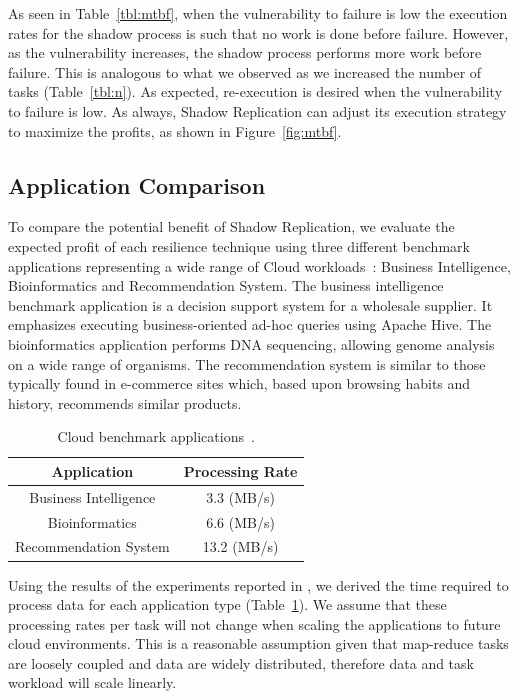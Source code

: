 As seen in Table~\ref{tbl:mtbf}, when the vulnerability to
failure is low the execution rates for the shadow process is such
that no work is done before failure. However, as the
vulnerability increases, the shadow process performs more work before
failure. This is analogous to what we observed as we increased the
number of tasks (Table~\ref{tbl:n}). As expected,
re-execution is desired when the vulnerability to failure is
low. As always, Shadow Replication can adjust its execution strategy to maximize the profits, as shown in Figure~\ref{fig:mtbf}.

\subsection{Application Comparison}

To compare the potential benefit of Shadow Replication, we evaluate
the expected profit of each resilience technique using three different
benchmark applications representing a wide range of
Cloud workloads~\cite{mrbs}: Business Intelligence, Bioinformatics and
Recommendation System. The business intelligence benchmark application
is a decision support system for a wholesale supplier. It emphasizes
executing business-oriented ad-hoc queries using Apache Hive. The
bioinformatics application performs DNA sequencing, allowing genome
analysis on a wide range of organisms. The recommendation system is
similar to those typically found in e-commerce sites which, based upon
browsing habits and history, recommends similar
products.

\begin{table}[h]
	\centering
    	\caption{Cloud benchmark applications~\cite{mrbs}.}
		\begin{tabular}{|c|c|}
			\hline
			Application               & Processing Rate \\
			\hline\hline
			Business Intelligence     & 3.3 (MB/s)      \\ \hline
			Bioinformatics            & 6.6 (MB/s)      \\ \hline
			Recommendation System     & 13.2 (MB/s)     \\
			\hline
       \end{tabular}
	   \label{tbl:application_processing_rates}
\end{table}

Using the results of the experiments reported in \cite{mrbs}, we
derived the time required to process data for each application type (Table~\ref{tbl:application_processing_rates}). We assume that
these processing rates per task will not change when scaling the
applications to future cloud environments. This is a reasonable
assumption given that map-reduce tasks are loosely coupled and data
are widely distributed, therefore data and task workload will scale
linearly.

